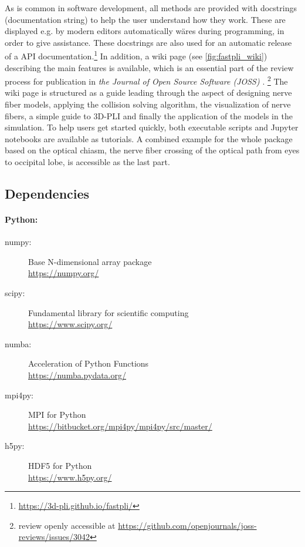 % 
As is common in software development, all methods are provided with docstrings (documentation string) to help the user understand how they work.
These are displayed e.g. by modern editors automatically wäres during programming, in order to give assistance.
These docstrings are also used for an automatic release of a \ac{API} documentation.\footnote{\url{https://3d-pli.github.io/fastpli/}}
In addition, a wiki page (see \cref{fig:fastpli_wiki}) describing the main features is available, which is an essential part of the review process for publication in \textit{the Journal of Open Source Software (JOSS)} \cite{Matuschke2021}. \footnote{review openly accessible at \url{https://github.com/openjournals/joss-reviews/issues/3042}}
The wiki page is structured as a guide leading through the aspect of designing nerve fiber models, applying the collision solving algorithm, the visualization of nerve fibers, a simple guide to \ac{3D-PLI} and finally the application of the models in the simulation.
To help users get started quickly, both executable \python{} scripts and Jupyter notebooks are available as tutorials.
A combined example for the whole package based on the optical chiasm, the nerve fiber crossing of the optical path from eyes to occipital lobe, is accessible as the last part.
% 
% 
% 
\subsection{Dependencies}
% 
\paragraph{Python:}
\begin{description}
\item[numpy:] Base N-dimensional array package \cite{2019arXiv190710121V}\\
\url{https://numpy.org/}
\item[scipy:] Fundamental library for scientific computing \cite{2019arXiv190710121V}\\
\url{https://www.scipy.org/} 
\item[numba:] Acceleration of Python Functions \cite{Lam2015}\\
\url{https://numba.pydata.org/}
\item[mpi4py:] MPI for Python \cite{Dalcn2005, Dalcn2008, Dalcin2011}\\
\url{https://bitbucket.org/mpi4py/mpi4py/src/master/}
\item[h5py:] HDF5 for Python \cite{collette_python_hdf5_2014, hdf5}\\
\url{https://www.h5py.org/}
\end{description}
% 
